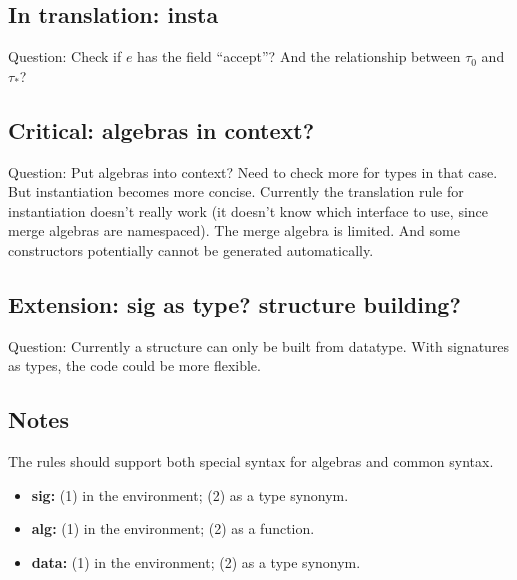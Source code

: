 \documentclass[a4paper]{article}
\begin{document}
\subsection{In translation: insta}

Question: Check if $e$ has the field ``accept''? And the relationship between $\tau_0$ and $\tau_*$?

\subsection{Critical: algebras in context?}

Question: Put algebras into context? Need to check more for types in that case. But instantiation becomes more concise. Currently the translation rule for instantiation doesn't really work (it doesn't know which interface to use, since merge algebras are namespaced). The merge algebra is limited. And some constructors potentially cannot be generated automatically.

\subsection{Extension: sig as type? structure building?}

Question: Currently a structure can only be built from datatype. With signatures as types, the code could be more flexible.

\subsection{Notes}

The rules should support both special syntax for algebras and common syntax.
\begin{itemize}
\item \textbf{sig:} (1) in the environment; (2) as a type synonym.
\item \textbf{alg:} (1) in the environment; (2) as a function.
\item \textbf{data:} (1) in the environment; (2) as a type synonym.
\end{itemize}
\end{document}
